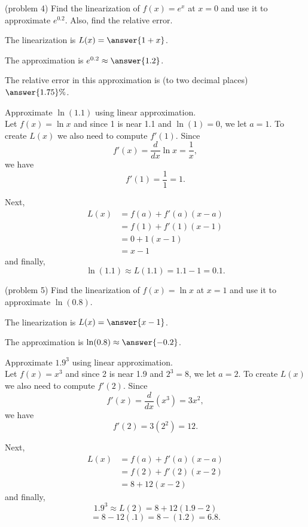\documentclass[handout]{ximera}
\begin{document}
 
 
 

\begin{problem}(problem 4)
Find the linearization of $f(x) = e^x$ at $x = 0$ and use it to approximate $e^{0.2}$.
Also, find the relative error.

The linearization is  $L(x) = \answer{1 + x}$.

The approximation is $e^{0.2} \approx \answer{1.2}$.

The relative error in this approximation is (to two decimal places) $\answer{1.75}\%$.


\end{problem}

\begin{example}[example 5]
Approximate $\ln(1.1)$ using linear approximation.\\ 
Let $f(x) = \ln x$ and since 1 is near 1.1 and $\ln(1) = 0$, we let 
$a = 1$. To create $L(x)$ we also need to compute $f'(1)$. 
Since 
\[f'(x) = \frac{d}{dx} \ln x = \frac{1}{x},\] 
we have
\[f'(1) = \frac{1}{1} = 1.\]

Next, 
\begin{align*}
L(x) &= f(a) + f'(a)(x - a) \\
&= f(1) + f'(1)(x - 1) \\
&= 0 + 1(x - 1)\\
&=x-1
\end{align*}
and finally,
\[\ln(1.1) \approx L(1.1) = 1.1 - 1 = 0.1.\]


\end{example}

\begin{problem}(problem 5)
Find the linearization of $f(x) = \ln x$ at $x = 1$ and use it to approximate $\ln(0.8)$.

The linearization is  $L(x) = \answer{x-1}$.

The approximation is $\ln(0.8) \approx \answer{-0.2}$.
\end{problem}

\begin{foldable}
\end{foldable}



\begin{example}[example 6]
Approximate $1.9^3$ using linear approximation.\\ 
Let $f(x) = x^3$ and since 2 is near 1.9 and $2^3 = 8$, we let 
$a = 2$. To create $L(x)$ we also need to compute $f'(2)$. 
Since 
\[f'(x) = \frac{d}{dx} (x^3) = 3x^2,\] 
we have
\[f'(2) = 3(2^2) = 12.\]

Next, 
\begin{align*}
L(x) &= f(a) + f'(a)(x - a) \\
&= f(2) + f'(2)(x - 2) \\
&= 8 + 12(x - 2)
\end{align*}
and finally,
\[1.9^3 \approx L(2) = 8 + 12(1.9 - 2) \]
\[= 8 - 12(.1) = 8-(1.2) = 6.8.\]
\end{example}
\end{document}
